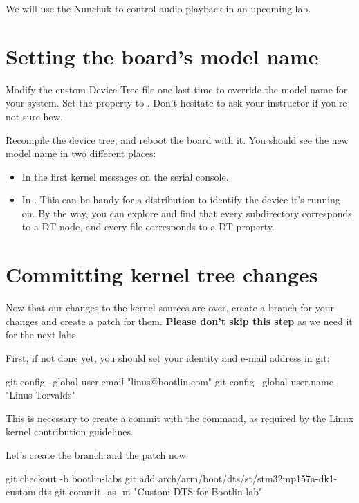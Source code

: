 {We will use the Nunchuk to control audio playback in an upcoming lab.

\section{Setting the board's model name}

Modify the custom Device Tree file one last time to override the model
name for your system. Set the  property to
. Don't hesitate to ask your
instructor if you're not sure how.

Recompile the device tree, and reboot the board with it. You should see
the new model name in two different places:

\begin{itemize}
\item In the first kernel messages on the serial console.
\item In . This can be
      handy for a distribution to identify the device it's running on.
      By the way, you can explore  and
      find that every subdirectory corresponds to a DT node, and every
      file corresponds to a DT property.
\end{itemize}

\section{Committing kernel tree changes}

Now that our changes to the kernel sources are over,
create a branch for your changes and create a patch for them.
{\bf Please don't skip this step} as we need it for the next labs.

First, if not done yet, you should set your identity
and e-mail address in git:

\begin{bashinput}
git config --global user.email "linus@bootlin.com"
git config --global user.name "Linus Torvalds"
\end{bashinput}

This is necessary to create a commit with the 
command, as required by the Linux kernel contribution guidelines.

Let's create the branch and the patch now:

\begin{bashinput}
git checkout -b bootlin-labs
git add arch/arm/boot/dts/st/stm32mp157a-dk1-custom.dts
git commit -as -m "Custom DTS for Bootlin lab"
\end{bashinput}

}

